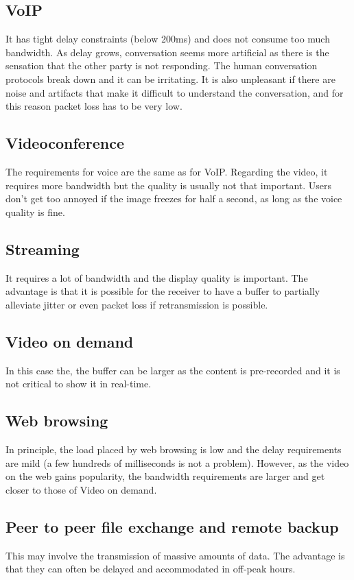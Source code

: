 \subsection{VoIP}
It has tight delay constraints (below 200ms) and does not consume too much bandwidth.
As delay grows, conversation seems more artificial as there is the sensation that the other party is not responding.
The human conversation protocols break down and it can be irritating.
It is also unpleasant if there are noise and artifacts that make it difficult to understand the conversation, and for this reason packet loss has to be very low.

\subsection{Videoconference}
The requirements for voice are the same as for VoIP.
Regarding the video, it requires more bandwidth but the quality is usually not that important.
Users don't get too annoyed if the image freezes for half a second, as long as the voice quality is fine.

\subsection{Streaming}
It requires a lot of bandwidth and the display quality is important.
The advantage is that it is possible for the receiver to have a buffer to partially alleviate jitter or even packet loss if retransmission is possible.

\subsection{Video on demand}
In this case the, the buffer can be larger as the content is pre-recorded and it is not critical to show it in real-time.

\subsection{Web browsing}
In principle, the load placed by web browsing is low and the delay requirements are mild (a few hundreds of milliseconds is not a problem). 
However, as the video on the web gains popularity, the bandwidth requirements are larger and get closer to those of Video on demand.

\subsection{Peer to peer file exchange and remote backup}
This may involve the transmission of massive amounts of data.
The advantage is that they can often be delayed and accommodated in off-peak hours.

